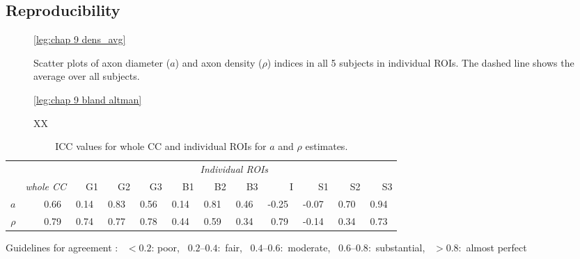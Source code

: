 \subsection*{Reproducibility}
\begin{figure}[ht]
	\centering
	\ref{leg:chap 9 dens_avg}\\	
	\caption{Scatter plots of axon diameter ($a$) and axon density ($\rho$) indices in all 5 subjects in individual ROIs. The dashed line shows the average over all subjects.}
	\label{fig:chap9 scan rescan scatterplots per subject}
\end{figure}

\begin{figure}[ht]
	\centering
	\ref{leg:chap 9 bland altman}	
	\caption{XX}
	\label{fig:chap9 bland altman plot}	
\end{figure}	



\begin{table}[ht]
\caption{ICC values for whole CC and individual ROIs for $a$ and $\rho$ estimates.}
\begin{adjustbox}{width={\textwidth},totalheight=\textheight,keepaspectratio}
\begin{tabular}{rrrrrrrrrrrr}
      \toprule
       & & \multicolumn{10}{c}{\textit{Individual ROIs}}                                             \\
       & \textit{whole CC} & G1    & G2    & G3    & B1    & B2    & B3    & I     & S1    & S2    & S3\\
       \cmidrule(rl){2-2} \cmidrule(l){3-12}
       \addlinespace
$a$    & 0.66~\usebox{\substantialBox} & 0.14~\usebox{\poorBox}  & 0.83~\usebox{\perfectBox} & 0.56~\usebox{\moderateBox}  & 0.14~\usebox{\poorBox}  & 0.81~\usebox{\perfectBox}  & 0.46~\usebox{\moderateBox}  & -0.25~\usebox{\poorBox} & -0.07~\usebox{\poorBox} & 0.70~\usebox{\substantialBox}  & 0.94~\usebox{\perfectBox}  \\
$\rho$ & 0.79~\usebox{\substantialBox} & 0.74~\usebox{\substantialBox}  & 0.77~\usebox{\substantialBox}  & 0.78~\usebox{\substantialBox}  & 0.44~\usebox{\moderateBox}  & 0.59~\usebox{\moderateBox}  & 0.34~\usebox{\fairBox}  & 0.79~\usebox{\substantialBox}  & -0.14~\usebox{\poorBox} & 0.34~\usebox{\fairBox}  & 0.73~\usebox{\substantialBox}  \\
\bottomrule
\end{tabular}
\end{adjustbox}
{\footnotesize Guidelines for agreement  \citep{Landis:1977}: \usebox{\poorBox}~$<0.2$: poor,  \usebox{\fairBox}~$0.2–0.4$:~fair,  \usebox{\moderateBox}~$0.4–0.6$:~moderate, \usebox{\substantialBox}~$0.6–0.8$:~substantial,  \usebox{\perfectBox}~$>0.8$:~almost perfect}
\end{table}


